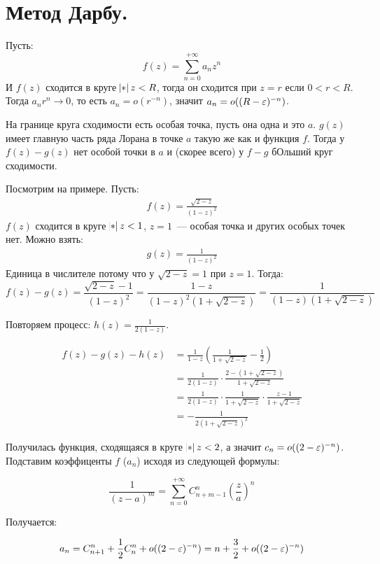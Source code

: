 \section{Метод Дарбу.}

Пусть:
$$f(z) = \sum\limits_{n=0}^{+\infty} a_nz^n$$ 
И $f(z)$ сходится в круге $\abs z < R$, тогда он сходится при
$z = r$ если $0 < r < R$. Тогда $a_nr^n \to 0$,
то есть $a_n = o(r^{-n})$,
значит $a_n = o((R-\varepsilon)^{-n})$.

На границе круга сходимости есть особая точка,
пусть она одна и это $a$.
$g(z)$ имеет главную часть ряда Лорана
в точке $a$ такую же как и функция $f$.
Тогда у $f(z)-g(z)$ нет особой точки в $a$
и (скорее всего) у $f-g$ бОльший круг сходимости.

Посмотрим на примере. Пусть: 
\begin{gather*}
    f(z) = \frac{\sqrt{2-z}}{(1-z)^2}
\end{gather*}
$f(z)$ сходится в круге $\abs z < 1$, $z = 1$~--- особая точка и других особых точек нет.
Можно взять: 
\begin{gather*}
    g(z) = \frac{1}{(1-z)^2}
\end{gather*}
Единица в числителе потому что у $\sqrt{2-z} = 1$ при $z = 1$. Тогда: 
\[
    f(z) - g(z) = \frac{\sqrt{2-z}-1}{(1-z)^2}
    = \frac{1-z}{(1-z)^2(1+\sqrt{2-z})}
    = \frac{1}{(1-z)(1+\sqrt{2-z})}
\]

Повторяем процесс: $h(z) = \frac{1}{2(1-z)}$.

\begin{align*}
    f(z) - g(z) - h(z) &= \frac{1}{1-z}
    \left(\frac{1}{1+\sqrt{2-z}} - \frac{1}{2}\right) \\ 
    &= \frac{1}{2(1-z)} \cdot \frac{2-(1+\sqrt{2-z})}{1+\sqrt{2-z}} \\ 
    &= \frac{1}{2(1-z)} \cdot \frac{1}{1+\sqrt{2-z}} \cdot \frac{z-1}{1+\sqrt{2-z}} \\ 
    &= -\frac{1}{2(1+\sqrt{2-z})^2}
\end{align*}

Получилась функция, сходящаяся в круге $\abs z < 2$,
а значит $c_n = o((2-\varepsilon)^{-n})$. Подставим коэффиценты
$f$ ($a_n$) исходя из следующей формулы:

\[
    \frac{1}{(z-a)^m} = \sum\limits_{n=0}^{+\infty}
    C_{n+m-1}^{n}
    \left(\frac{z}{a} \right)^n
\]

Получается:

\[
    a_n = C_{n+1}^n + \frac{1}{2}C_n^n + o((2-\varepsilon)^{-n})
    = n + \frac{3}{2} + o((2-\varepsilon)^{-n})
\]

\newpage
